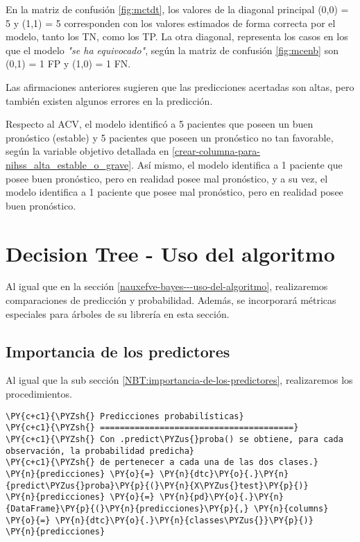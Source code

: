    	En la matriz de confusión \ref{fig:mctdt}, los valores de la diagonal principal (0,0) = 5 y (1,1) = 5 corresponden con los valores estimados de forma correcta por el modelo, tanto los TN, como los TP. La otra diagonal, representa los casos en los que el modelo \textit{"se ha equivocado"}, según la matriz de confusión \ref{fig:mcenb} son (0,1) = 1 FP y (1,0) = 1 FN.
\par Las afirmaciones anteriores sugieren que las predicciones acertadas son altas, pero también existen algunos errores en la predicción.
\par Respecto al ACV, el modelo identificó a 5 pacientes que poseen un buen pronóstico (estable) y 5 pacientes que poseen un pronóstico no tan favorable, según la variable objetivo detallada en \ref{crear-columna-para-nihss_alta_estable_o_grave}. Así mismo, el modelo identifica a 1 paciente que posee buen pronóstico, pero en realidad posee mal pronóstico, y a su vez, el modelo identifica a 1 paciente que posee mal pronóstico, pero en realidad posee buen pronóstico.\\

    \hypertarget{decision-tree---uso-del-algoritmo}{%
\section{Decision Tree - Uso del algoritmo}\label{decision-tree---uso-del-algoritmo}}

	Al igual que en la sección \ref{nauxefve-bayes---uso-del-algoritmo}, realizaremos comparaciones de predicción y probabilidad. Además, se incorporará métricas especiales para árboles de su librería en esta sección.

    \hypertarget{importancia-de-los-predictores}{%
\subsection{Importancia de los predictores}\label{importancia-de-los-predictores}}

	Al igual que la sub sección \ref{NBT:importancia-de-los-predictores}, realizaremos los procedimientos.\\

    \begin{tcolorbox}[breakable, size=fbox, boxrule=1pt, pad at break*=1mm,colback=cellbackground, colframe=cellborder]
\begin{Verbatim}[commandchars=\\\{\}]
\PY{c+c1}{\PYZsh{} Predicciones probabilísticas}
\PY{c+c1}{\PYZsh{} =======================================}
\PY{c+c1}{\PYZsh{} Con .predict\PYZus{}proba() se obtiene, para cada observación, la probabilidad predicha}
\PY{c+c1}{\PYZsh{} de pertenecer a cada una de las dos clases.}
\PY{n}{predicciones} \PY{o}{=} \PY{n}{dtc}\PY{o}{.}\PY{n}{predict\PYZus{}proba}\PY{p}{(}\PY{n}{X\PYZus{}test}\PY{p}{)}
\PY{n}{predicciones} \PY{o}{=} \PY{n}{pd}\PY{o}{.}\PY{n}{DataFrame}\PY{p}{(}\PY{n}{predicciones}\PY{p}{,} \PY{n}{columns} \PY{o}{=} \PY{n}{dtc}\PY{o}{.}\PY{n}{classes\PYZus{}}\PY{p}{)}
\PY{n}{predicciones}
\end{Verbatim}
\end{tcolorbox}

